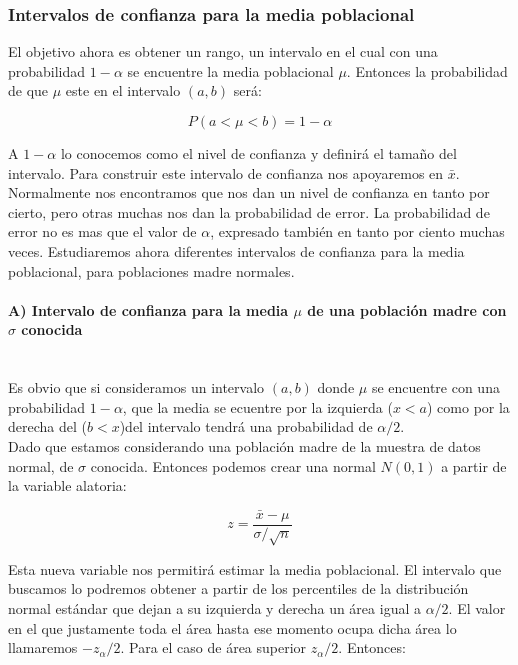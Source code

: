 \documentclass[12pt,a4paper]{book}
\begin{document}
\subsubsection{Intervalos de confianza para la media poblacional}

El objetivo ahora es obtener un rango, un intervalo en el cual con una probabilidad $1 - \alpha$ se encuentre la media poblacional $\mu$. Entonces la probabilidad de que $\mu$ este en el intervalo $(a,b)$ será:

$$ P(a < \mu < b) = 1 - \alpha $$   

A $1 - \alpha$ lo conocemos como el nivel de confianza y definirá el tamaño del intervalo. Para construir este intervalo de confianza nos apoyaremos en $\bar{x}$. Normalmente nos encontramos que nos dan un nivel de confianza en tanto por cierto, pero otras muchas nos dan la probabilidad de error. La probabilidad de error no es mas que el valor de $\alpha$, expresado también en tanto por ciento muchas veces. Estudiaremos ahora diferentes intervalos de confianza para la media poblacional, para poblaciones madre normales.  \\


\paragraph{A) Intervalo de confianza para la media $\mu$ de una población madre con $\sigma$ conocida \\ \\ }

Es obvio que si consideramos un intervalo $(a,b)$ donde $\mu$  se encuentre con una probabilidad $1- \alpha$, que la media se ecuentre por la izquierda ($x<a$) como por la derecha del  ($b<x$)del intervalo tendrá una probabilidad de $\alpha/2$.\\

Dado que estamos considerando una población madre de la muestra de datos normal, de $\sigma$ conocida. Entonces podemos crear una normal $N(0,1)$ a partir de la variable alatoria:

$$ z = \dfrac{\bar{x}-\mu}{\sigma / \sqrt{n}} $$

Esta nueva variable nos permitirá estimar la media poblacional. El intervalo que buscamos lo podremos obtener a partir de los percentiles de la distribución normal estándar que dejan a su izquierda y derecha un área igual a $\alpha/2$. El valor en el que justamente toda el área hasta ese momento ocupa dicha área lo llamaremos $-z{_\alpha/2}$. Para el caso de área superior $z{_\alpha/2}$. Entonces:
\end{document}
